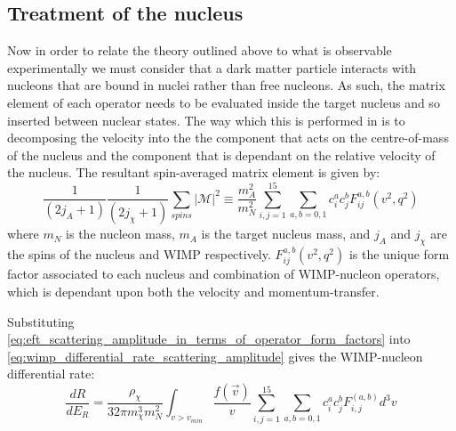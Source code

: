 \subsection{Treatment of the nucleus}
\par
Now in order to relate the theory outlined above to what is observable experimentally we must consider that a dark matter particle interacts with nucleons that are bound in nuclei rather than free nucleons.
As such, the matrix element of each operator needs to be evaluated inside the target nucleus and so inserted between nuclear states.
The way which this is performed in \cite{Fitzpatrick_2013_ref} is to decomposing the velocity into the the component that acts on the centre-of-mass of the nucleus and the component that is dependant on the relative velocity of the nucleus.
The resultant spin-averaged matrix element is given by:
\begin{equation}
    \frac{1}{(2j_A + 1)}\frac{1}{(2j_\chi + 1)} \sum_{spins} |\mathcal{M}|^2 \equiv
    \frac{m_A^2}{m_N^2} \sum_{i,j=1}^{15} \sum_{a,b=0,1} c_i^{a}c_{j}^{b} F_{ij}^{a,b} (v^2,q^2)
    \label{eq:eft_scattering_amplitude_in_terms_of_operator_form_factors}
\end{equation}
where $m_N$ is the nucleon mass, $m_A$ is the target nucleus mass, and $j_A$ and $j_\chi$ are the spins of the nucleus and WIMP respectively. 
$F^{a,b}_{ij} (v^2,q^2)$ is the unique form factor associated to each nucleus and combination of WIMP-nucleon operators, which is dependant upon both the velocity and momentum-transfer.

\par
Substituting \autoref{eq:eft_scattering_amplitude_in_terms_of_operator_form_factors} into \autoref{eq:wimp_differential_rate_scattering_amplitude} gives the WIMP-nucleon differential rate:
\begin{equation}
    \frac{dR}{dE_R} = \frac{\rho_{\chi}}{32 \pi m_\chi^3 m_N^2} \int_{v>v_{min}} \frac{f(\vec{v})}{v} \sum_{i,j=1}^{15} \sum_{a,b=0,1} c_i^a c_j^b F_{i,j}^{(a,b)} d^3 v
    \label{eq:final_eft_differential_cross_section}
\end{equation}


